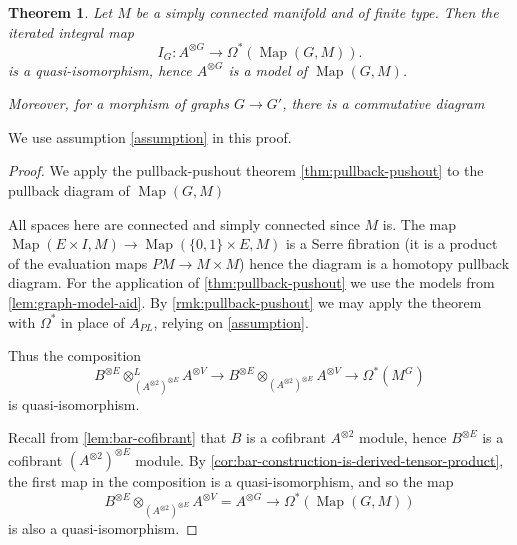 \documentclass{scrartcl}
\theoremstyle{plain}
\newtheorem{theorem}{Theorem}[section]
\theoremstyle{definition}
\newcommand{\APL}{A_{PL}}
\DeclareMathOperator{\Map}{Map}
\begin{document}
\begin{theorem}\label{thm:graph-mapping-space}
    Let $M$ be a simply connected manifold and of finite type. Then the iterated integral map 
    $$I_G\colon A^{\otimes G} \to \Omega^*(\Map(G, M)).$$
    is a quasi-isomorphism, hence $A^ {\otimes G}$ is a model of $\Map(G, M)$.

    Moreover, for a morphism of graphs $G\to G'$, there is a commutative diagram
    \begin{center}
    \end{center}
\end{theorem}
We use assumption \ref{assumption} in this proof. 
\begin{proof}
    We apply the pullback-pushout theorem \ref{thm:pullback-pushout} to the pullback diagram of $\Map(G, M)$
    \begin{center}
    \end{center}
    All spaces here are connected and simply connected since $M$ is. The map $\Map(E\times I, M)\to\Map(\{0,1\}\times E, M)$ is a Serre fibration (it is a product of the evaluation maps $PM\to M\times M$) hence the diagram is a homotopy pullback diagram. 
    For the application of \cref{thm:pullback-pushout} we use the models from \cref{lem:graph-model-aid}. By \cref{rmk:pullback-pushout} we may apply the theorem with $\Omega^*$ in place of $\APL$, relying on \cref{assumption}. 

    Thus the composition $$B^{\otimes E}\otimes^L_{(A^{\otimes 2})^{\otimes E}} A^{\otimes V} \to B^{\otimes E}\otimes_{(A^{\otimes 2})^{\otimes E}} A^{\otimes V} \to \Omega^*(M^G)$$ is quasi-isomorphism. 

    Recall from \cref{lem:bar-cofibrant} that $B$ is a cofibrant $A^{\otimes 2}$ module, hence $B^{\otimes E}$ is a cofibrant $(A^{\otimes 2})^{\otimes E}$ module. By \cref{cor:bar-construction-is-derived-tensor-product}, the first map in the composition is a quasi-isomorphism, and so the map $$B^{\otimes E}\otimes_{(A^{\otimes 2})^{\otimes E}} A^{\otimes V} = A^{\otimes G}\to \Omega^*(\Map(G, M))$$
    is also a quasi-isomorphism.
\end{proof}
\end{document}
